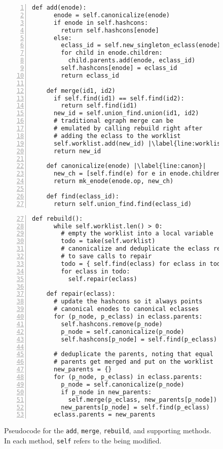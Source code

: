 \begin{figure}
  \begin{minipage}[t]{0.47\linewidth}
    \begin{lstlisting}[gobble=4, numbers=left, basicstyle=\scriptsize\ttfamily, escapechar=|, xleftmargin=13pt, numbersep=7pt]
    def add(enode):
      enode = self.canonicalize(enode)
      if enode in self.hashcons:
        return self.hashcons[enode]
      else:
        eclass_id = self.new_singleton_eclass(enode)
        for child in enode.children:
          child.parents.add(enode, eclass_id)
        self.hashcons[enode] = eclass_id
        return eclass_id

    def merge(id1, id2)
      if self.find(id1) == self.find(id2):
        return self.find(id1)
      new_id = self.union_find.union(id1, id2)
      # traditional egraph merge can be
      # emulated by calling rebuild right after
      # adding the eclass to the worklist
      self.worklist.add(new_id) |\label{line:worklist-add}|
      return new_id

    def canonicalize(enode) |\label{line:canon}|
      new_ch = [self.find(e) for e in enode.children]
      return mk_enode(enode.op, new_ch)

    def find(eclass_id):
      return self.union_find.find(eclass_id)
    \end{lstlisting}
  \end{minipage}
  \hfill
  \begin{minipage}[t]{0.45\linewidth}
    \begin{lstlisting}[gobble=4, numbers=left, firstnumber=27, basicstyle=\scriptsize\ttfamily, numbersep=7pt]
    def rebuild():
      while self.worklist.len() > 0:
        # empty the worklist into a local variable
        todo = take(self.worklist)
        # canonicalize and deduplicate the eclass refs
        # to save calls to repair
        todo = { self.find(eclass) for eclass in todo }
        for eclass in todo:
          self.repair(eclass)

    def repair(eclass):
      # update the hashcons so it always points
      # canonical enodes to canonical eclasses
      for (p_node, p_eclass) in eclass.parents:
        self.hashcons.remove(p_node)
        p_node = self.canonicalize(p_node)
        self.hashcons[p_node] = self.find(p_eclass)

      # deduplicate the parents, noting that equal
      # parents get merged and put on the worklist
      new_parents = {}
      for (p_node, p_eclass) in eclass.parents:
        p_node = self.canonicalize(p_node)
        if p_node in new_parents:
          self.merge(p_eclass, new_parents[p_node])
        new_parents[p_node] = self.find(p_eclass)
      eclass.parents = new_parents
    \end{lstlisting}
  \end{minipage}
  \caption{
    Pseudocode for the \texttt{add}, \texttt{merge}, \texttt{rebuild}, and
    supporting methods.
    In each method, \texttt{self} refers to the \egraph being modified.
  }
  \label{fig:rebuild-code}
\end{figure}

